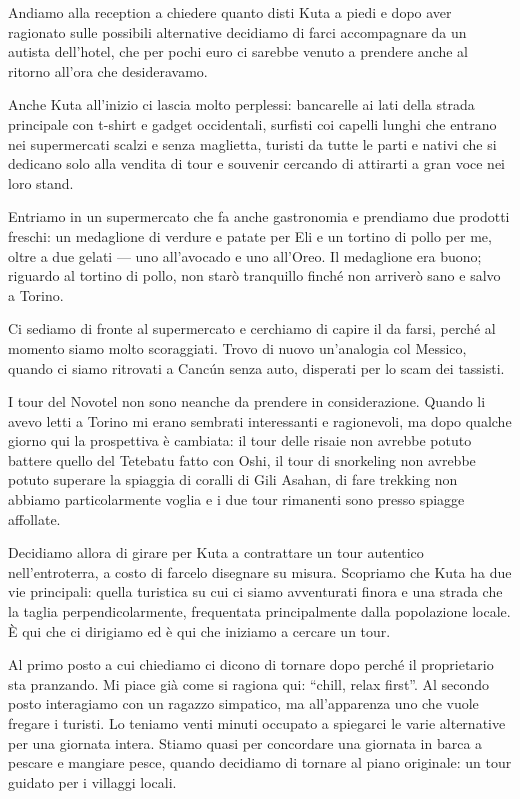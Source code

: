 Andiamo alla reception a chiedere quanto disti Kuta a piedi e dopo aver ragionato sulle possibili alternative decidiamo di farci accompagnare da un autista dell'hotel, che per pochi euro ci sarebbe venuto a prendere anche al ritorno all'ora che desideravamo.

Anche Kuta all'inizio ci lascia molto perplessi: bancarelle ai lati della strada principale con t-shirt e gadget occidentali, surfisti coi capelli lunghi che entrano nei supermercati scalzi e senza maglietta, turisti da tutte le parti e nativi che si dedicano solo alla vendita di tour e souvenir cercando di attirarti a gran voce nei loro stand.

Entriamo in un supermercato che fa anche gastronomia e prendiamo due prodotti freschi: un medaglione di verdure e patate per Eli e un tortino di pollo per me, oltre a due gelati — uno all'avocado e uno all'Oreo. Il medaglione era buono; riguardo al tortino di pollo, non starò tranquillo finché non arriverò sano e salvo a Torino.

Ci sediamo di fronte al supermercato e cerchiamo di capire il da farsi, perché al momento siamo molto scoraggiati. Trovo di nuovo un'analogia col Messico, quando ci siamo ritrovati a Cancún senza auto, disperati per lo scam dei tassisti.

I tour del Novotel non sono neanche da prendere in considerazione. Quando li avevo letti a Torino mi erano sembrati interessanti e ragionevoli, ma dopo qualche giorno qui la prospettiva è cambiata: il tour delle risaie non avrebbe potuto battere quello del Tetebatu fatto con Oshi, il tour di snorkeling non avrebbe potuto superare la spiaggia di coralli di Gili Asahan, di fare trekking non abbiamo particolarmente voglia e i due tour rimanenti sono presso spiagge affollate.

Decidiamo allora di girare per Kuta a contrattare un tour autentico nell'entroterra, a costo di farcelo disegnare su misura. Scopriamo che Kuta ha due vie principali: quella turistica su cui ci siamo avventurati finora e una strada che la taglia perpendicolarmente, frequentata principalmente dalla popolazione locale. È qui che ci dirigiamo ed è qui che iniziamo a cercare un tour.

Al primo posto a cui chiediamo ci dicono di tornare dopo perché il proprietario sta pranzando. Mi piace già come si ragiona qui: “chill, relax first”. Al secondo posto interagiamo con un ragazzo simpatico, ma all'apparenza uno che vuole fregare i turisti. Lo teniamo venti minuti occupato a spiegarci le varie alternative per una giornata intera. Stiamo quasi per concordare una giornata in barca a pescare e mangiare pesce, quando decidiamo di tornare al piano originale: un tour guidato per i villaggi locali.


